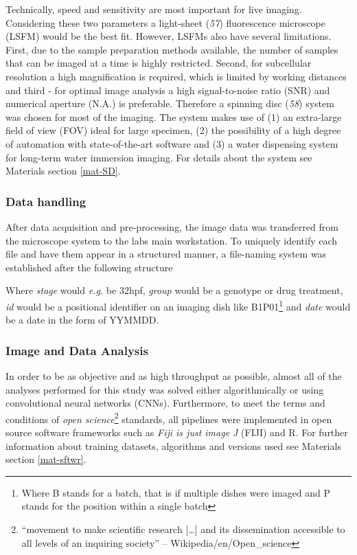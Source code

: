 \documentclass[10pt, b5paper, singlespacinge, twoside]{reedthesis} %
\theoremstyle{definition}
\theoremstyle{definition}
\theoremstyle{definition}
\theoremstyle{remark}
\begin{document}
Technically, speed and sensitivity are most important for live imaging. Considering these two parameters a light-sheet (\emph{57}) fluorescence microscope (LSFM) would be the best fit. However, LSFMs also have several limitations. First, due to the sample preparation methods available, the number of samples that can be imaged at a time is highly restricted. Second, for subcellular resolution a high magnification is required, which is limited by working distances and third - for optimal image analysis a high signal-to-noise ratio (SNR) and numerical aperture (N.A.) is preferable. Therefore a spinning disc (\emph{58}) system was chosen for most of the imaging.
The system makes use of (1) an extra-large field of view (FOV) ideal for large specimen, (2) the possibility of a high degree of automation with state-of-the-art software and (3) a water dispensing system for long-term water immersion imaging. For details about the system see Materials section \ref{mat-SD}.

\hypertarget{data-handling}{%
\subsubsection{Data handling}\label{data-handling}}

After data acquisition and pre-processing, the image data was transferred from the microscope system to the labs main workstation. To uniquely identify each file and have them appear in a structured manner, a file-naming system was established after the following structure

\makebox[\linewidth]{$[stage]\_[group]\_[id]\_[date]$}
\newline

Where \emph{stage} would \emph{e.g.} be 32hpf, \emph{group} would be a genotype or drug treatment, \emph{id} would be a positional identifier on an imaging dish like B1P01\footnote{Where B stands for a batch, that is if multiple dishes were imaged and P stands for the position within a single batch} and \emph{date} would be a date in the form of YYMMDD.

\hypertarget{image-and-data-analysis}{%
\subsubsection{Image and Data Analysis}\label{image-and-data-analysis}}

In order to be as objective and as high throughput as possible, almost all of the analyses performed for this study was solved either algorithmically or using convolutional neural networks (CNNs). Furthermore, to meet the terms and conditions of \emph{open science}\footnote{``movement to make scientific research {[}\ldots{]} and its dissemination accessible to all levels of an inquiring society'' -- Wikipedia/en/Open\_science} standards, all pipelines were implemented in open source software frameworks such as \emph{Fiji is just image J} (FIJI) and R. For further information about training datasets, algorithms and versions used see Materials section \ref{mat-sftwr}.
\end{document}
